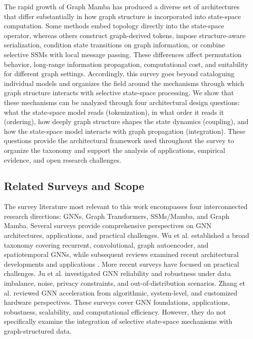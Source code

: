 \documentclass[acmsmall]{acmart}
\begin{document}
The rapid growth of Graph Mamba has produced a diverse set of architectures
that differ substantially in how graph structure is incorporated into
state-space computation. Some methods embed topology directly into the
state-space operator, whereas others construct graph-derived tokens, impose
structure-aware serialization, condition state transitions on graph
information, or combine selective SSMs with local message passing. These
differences affect permutation behavior, long-range information propagation,
computational cost, and suitability for different graph settings. Accordingly,
this survey goes beyond cataloguing individual models and organizes the field
around the mechanisms through which graph structure interacts with selective
state-space processing.
We show that these mechanisms can be analyzed through four architectural design questions: what the state-space model reads (tokenization), in what order it reads it (ordering), how deeply graph structure shapes the state dynamics (coupling), and how the state-space model interacts with graph propagation (integration). These questions provide the architectural framework used throughout the survey to organize the taxonomy and support the analysis of applications, empirical evidence, and open research challenges.



\subsection{Related Surveys and Scope}

The survey literature most relevant to this work encompasses four interconnected
research directions: GNNs, Graph Transformers, SSMs/Mamba, and Graph Mamba. 
Several surveys provide comprehensive perspectives on GNN architectures, applications, and practical challenges. Wu et al. \cite{wu2020comprehensive} established a broad taxonomy covering recurrent, convolutional, graph autoencoder, and spatiotemporal GNNs, while subsequent reviews examined recent architectural developments and applications \cite{khemani2024review}. More recent surveys have focused on practical challenges. Ju et al. \cite{ju2025survey} investigated GNN reliability and robustness under data imbalance, noise, privacy constraints, and out-of-distribution scenarios. Zhang et al. \cite{zhang2026survey} reviewed GNN acceleration from algorithmic, system-level, and customized hardware perspectives. These surveys cover GNN foundations, applications, robustness, scalability, and computational efficiency. However, they do not specifically examine the integration of selective state-space mechanisms with graph-structured data.
\end{document}
